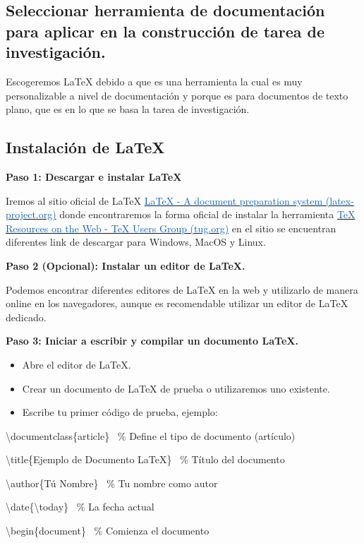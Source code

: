 \documentclass[letterpaper]{article}
\newcommand\textstyleInternetlink[1]{\textcolor[HTML]{0563C1}{#1}}
\begin{document}
\bigskip

\subsection{Seleccionar herramienta de documentación para aplicar en la construcción de tarea de investigación.}
Escogeremos LaTeX debido a que es una herramienta la cual es muy personalizable a nivel de documentación y porque es
para documentos de texto plano, que es en lo que se basa la tarea de investigación. 

\subsection{Instalación de LaTeX}
\textbf{Paso 1: Descargar e instalar LaTeX}

Iremos al sitio oficial de LaTeX \href{https://www.latex-project.org/}{\textstyleInternetlink{LaTeX - A document
preparation system (latex-project.org)}} donde encontraremos la forma oficial de instalar la herramienta
\href{https://www.tug.org/interest.html#free}{\textstyleInternetlink{TeX Resources on the Web - TeX Users Group
(tug.org)}} en el sitio se encuentran diferentes link de descargar para Windows, MacOS y Linux.

\textbf{Paso 2 (Opcional): Instalar un editor de LaTeX.}

Podemos encontrar diferentes editores de LaTeX en la web y utilizarlo de manera online en los navegadores, aunque es
recomendable utilizar un editor de LaTeX dedicado.

\textbf{Paso 3: Iniciar a escribir y compilar un documento LaTeX.}

\begin{itemize}[series=listWWNumxix,]
\item Abre el editor de LaTeX.
\item Crear un documento de LaTeX de prueba o utilizaremos uno existente.
\item Escribe tu primer código de prueba, ejemplo:
\end{itemize}
{\textbackslash}documentclass\{article\} \ \% Define el tipo de documento (artículo)

{\textbackslash}title\{Ejemplo de Documento LaTeX\} \ \% Título del documento

{\textbackslash}author\{Tú Nombre\} \ \% Tu nombre como autor

{\textbackslash}date\{{\textbackslash}today\} \ \% La fecha actual

{\textbackslash}begin\{document\} \ \% Comienza el documento
\end{document}
